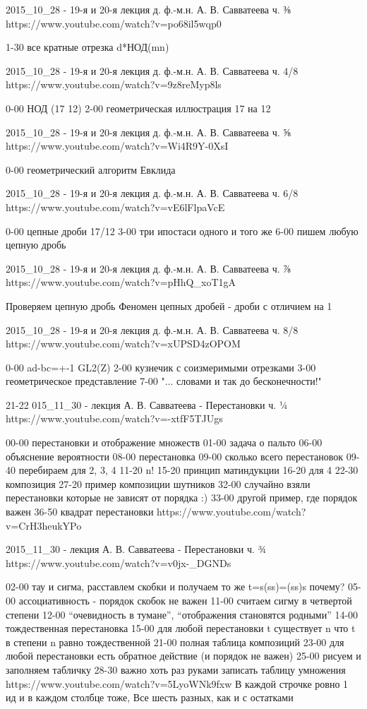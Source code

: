 2015_10_28 - 19-я и 20-я лекция д. ф.-м.н. А. В. Савватеева ч. ⅜
https://www.youtube.com/watch?v=po68il5wqp0

1-30 все кратные отрезка d*НОД(mn)

2015_10_28 - 19-я и 20-я лекция д. ф.-м.н. А. В. Савватеева ч. 4/8
https://www.youtube.com/watch?v=9z8reMyp8ls

0-00 НОД (17 12)
2-00 геометрическая иллюстрация 17 на 12

2015_10_28 - 19-я и 20-я лекция д. ф.-м.н. А. В. Савватеева ч. ⅝
https://www.youtube.com/watch?v=Wi4R9Y-0XsI

0-00 геометрический алгоритм Евклида

2015_10_28 - 19-я и 20-я лекция д. ф.-м.н. А. В. Савватеева ч. 6/8
https://www.youtube.com/watch?v=vE6lFlpaVcE

0-00 цепные дроби 17/12
3-00 три ипостаси одного и того же
6-00 пишем любую цепную дробь

2015_10_28 - 19-я и 20-я лекция д. ф.-м.н. А. В. Савватеева ч. ⅞
https://www.youtube.com/watch?v=pHhQ_xoT1gA

Проверяем цепную дробь
Феномен цепных дробей - дроби с отличием на 1

2015_10_28 - 19-я и 20-я лекция д. ф.-м.н. А. В. Савватеева ч. 8/8
https://www.youtube.com/watch?v=xUPSD4zOPOM


0-00 ad-bc=+-1 GL2(Z)
2-00 кузнечик с соизмеримыми отрезками
3-00 геометрическое представление
7-00 "... словами и так до бесконечности!"

21-22
015_11_30 - лекция А. В. Савватеева - Перестановки ч. ¼
https://www.youtube.com/watch?v=-xtfF5TJUgs

00-00 перестановки и отображение множеств
01-00 задача о пальто
06-00 объяснение вероятности
08-00 перестановка
09-00 сколько всего перестановок
09-40 перебираем для 2, 3, 4
11-20 n!
15-20 принцип матиндукции
16-20 для 4
22-30 композиция
27-20 пример композиции шутников
32-00 случайно взяли перестановки которые не зависят от порядка :)
33-00 другой пример, где порядок важен
36-50 квадрат перестановки
https://www.youtube.com/watch?v=CrH3heukYPo

2015_11_30 - лекция А. В. Савватеева - Перестановки ч. ¾
https://www.youtube.com/watch?v=v0jx-_DGNDs

02-00 тау и сигма, расставлем скобки и получаем то же t=s(ss)=(ss)s почему?
05-00 ассоциативность - порядок скобок не важен
11-00 считаем сигму в четвертой степени
12-00 “очевидность в тумане”, “отображения становятся родными”
14-00 тождественная перестановка
15-00 для любой перестановки t существует n что t в степени n равно тождественной
21-00 полная таблица композиций
23-00 для любой перестановки есть обратное действие (и порядок не важен)
25-00 рисуем и заполняем табличку
28-30 важно хоть раз руками записать таблицу умножения
https://www.youtube.com/watch?v=5LyoWNk9fxw
В каждой строчке ровно 1 ид и в каждом столбце тоже, 
Все шесть разных, как и с остатками

